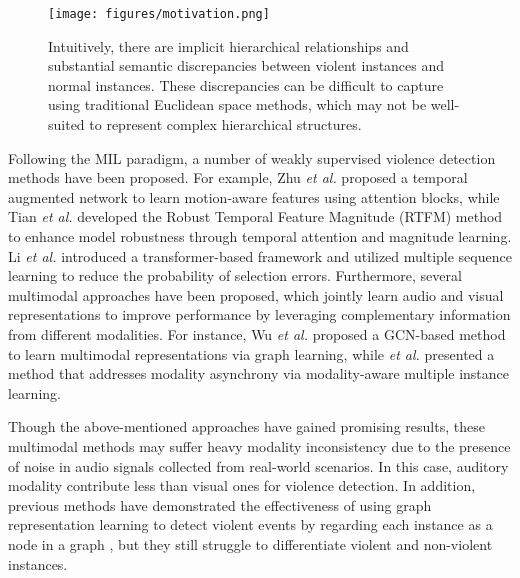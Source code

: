 \documentclass[sigconf]{acmart}
\newcommand{\etal}{{\emph{et al. }}}
\begin{document}
\begin{figure}[t]
    \centering
\texttt{[image: figures/motivation.png]} \caption{Intuitively, there are implicit hierarchical relationships and substantial semantic discrepancies between violent instances and normal instances. These discrepancies can be difficult to capture using traditional Euclidean space methods, which may not be well-suited to represent complex hierarchical structures.}
    \label{fig1}
\end{figure}


Following the MIL paradigm, a number of weakly supervised violence detection methods have been proposed. For example, Zhu \etal\cite{Zhu_Newsam_2019} proposed a temporal augmented network to learn motion-aware features using attention blocks, while Tian \etal\cite{c:1} developed the Robust Temporal Feature Magnitude (RTFM) method to enhance model robustness through temporal attention and magnitude learning. Li \etal\cite{c:9} introduced a transformer-based framework and utilized multiple sequence learning to reduce the probability of selection errors. Furthermore, several multimodal approaches have been proposed, which jointly learn audio and visual representations to improve performance by leveraging complementary information from different modalities\cite{c:2,c:4,pang2021violence,Pu_Wu_2022}. For instance, Wu \etal\cite{c:2} proposed a GCN-based method to learn multimodal representations via graph learning, while \etal \cite{c:4} presented a method that addresses modality asynchrony via modality-aware multiple instance learning. 




Though the above-mentioned approaches have gained promising results, these multimodal methods may suffer heavy modality inconsistency due to the presence of noise in audio signals collected from real-world scenarios. In this case, auditory modality contribute less than visual ones for violence detection. In addition, previous methods have demonstrated the effectiveness of using graph representation learning to detect violent events by regarding each instance as a node in a graph \cite{c:2, c:3}, but they still struggle to differentiate violent and non-violent instances. 
\end{document}
